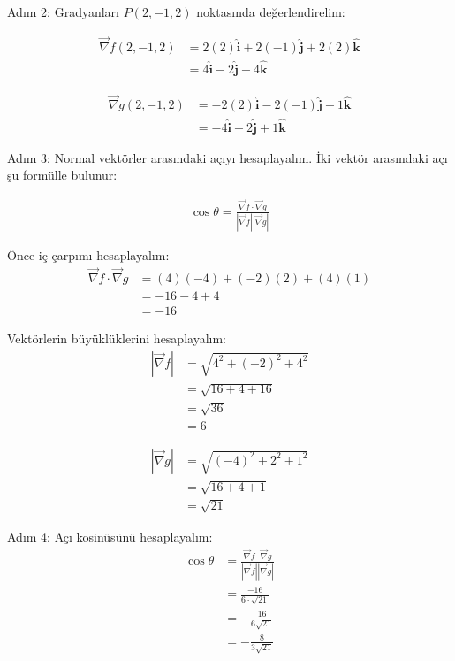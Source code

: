 \documentclass[11pt,letterpaper,twocolumn]{fenbil}
\begin{document}
Adım 2: Gradyanları $P(2, -1, 2)$ noktasında değerlendirelim:

\begin{align}
\vec{\nabla} f(2, -1, 2) &= 2(2)\hat{\mathbf{i}} + 2(-1)\hat{\mathbf{j}} + 2(2)\hat{\mathbf{k}} \\
&= 4\hat{\mathbf{i}} - 2\hat{\mathbf{j}} + 4\hat{\mathbf{k}}
\end{align}

\begin{align}
\vec{\nabla} g(2, -1, 2) &= -2(2)\hat{\mathbf{i}} - 2(-1)\hat{\mathbf{j}} + 1\hat{\mathbf{k}} \\
&= -4\hat{\mathbf{i}} + 2\hat{\mathbf{j}} + 1\hat{\mathbf{k}}
\end{align}

Adım 3: Normal vektörler arasındaki açıyı hesaplayalım. İki vektör arasındaki açı şu formülle bulunur:

\begin{align}
\cos\theta = \frac{\vec{\nabla} f \cdot \vec{\nabla} g}{|\vec{\nabla} f||\vec{\nabla} g|}
\end{align}

Önce iç çarpımı hesaplayalım:
\begin{align}
\vec{\nabla} f \cdot \vec{\nabla} g &= (4)(-4) + (-2)(2) + (4)(1) \\
&= -16 - 4 + 4 \\
&= -16
\end{align}

\vspace{2mm}
\vspace{2mm}
\vspace{2mm}
\vspace{2mm}
\hspace{10mm}
Vektörlerin büyüklüklerini hesaplayalım:
\begin{align}
|\vec{\nabla} f| &= \sqrt{4^2 + (-2)^2 + 4^2} \\
&= \sqrt{16 + 4 + 16} \\
&= \sqrt{36} \\
&= 6
\end{align}

\begin{align}
|\vec{\nabla} g| &= \sqrt{(-4)^2 + 2^2 + 1^2} \\
&= \sqrt{16 + 4 + 1} \\
&= \sqrt{21}
\end{align}

Adım 4: Açı kosinüsünü hesaplayalım:
\begin{align}
\cos\theta &= \frac{\vec{\nabla} f \cdot \vec{\nabla} g}{|\vec{\nabla} f||\vec{\nabla} g|} \\
&= \frac{-16}{6 \cdot \sqrt{21}} \\
&= -\frac{16}{6\sqrt{21}} \\
&= -\frac{8}{3\sqrt{21}}
\end{align}
\end{document}
